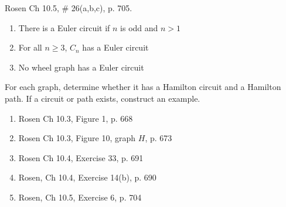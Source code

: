 \begin{questions}
\begin{solution}
    \end{solution}



 Rosen Ch 10.5, \# 26(a,b,c), p. 705.
    \ifprintanswers
        \vspace{-10pt}
    \fi
    \begin{solution}
    \begin{enumerate}[label=(\alph*), topsep=0pt, itemsep=0pt, parsep=0pt]
        \item There is a Euler circuit if $n$ is odd and $n>1$
        \item For all $n\geq3$, $C_n$ has a Euler circuit
        \item No wheel graph has a Euler circuit
    \end{enumerate}
    \end{solution}



 For each graph, determine whether it has a Hamilton circuit and a Hamilton path.  If a circuit or path exists, construct an example.
\begin{enumerate}[label=(\alph*), topsep=0pt, itemsep=0pt, parsep=0pt]
    \item Rosen Ch 10.3, Figure 1, p. 668
    \item Rosen Ch 10.3, Figure 10, graph $H$, p. 673
    \item Rosen Ch 10.4, Exercise 33, p. 691
    \item Rosen, Ch 10.4, Exercise 14(b), p. 690
    \item Rosen, Ch 10.5, Exercise 6, p. 704
\end{enumerate}


\end{questions}
